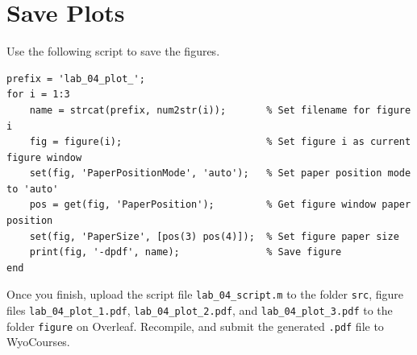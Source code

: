 \section{Save Plots}
Use the following script to save the figures.

\begin{lstlisting}[style=MATLAB]
prefix = 'lab_04_plot_';
for i = 1:3
    name = strcat(prefix, num2str(i));       % Set filename for figure i
    fig = figure(i);                         % Set figure i as current figure window
    set(fig, 'PaperPositionMode', 'auto');   % Set paper position mode to 'auto'
    pos = get(fig, 'PaperPosition');         % Get figure window paper position
    set(fig, 'PaperSize', [pos(3) pos(4)]);  % Set figure paper size
    print(fig, '-dpdf', name);               % Save figure
end
\end{lstlisting}

Once you finish, upload the script file \verb|lab_04_script.m| to the folder \verb|src|, figure files \verb|lab_04_plot_1.pdf|,  \verb|lab_04_plot_2.pdf|, and \verb|lab_04_plot_3.pdf| to the folder \verb|figure| on Overleaf. Recompile, and submit the generated \verb|.pdf| file to WyoCourses.
